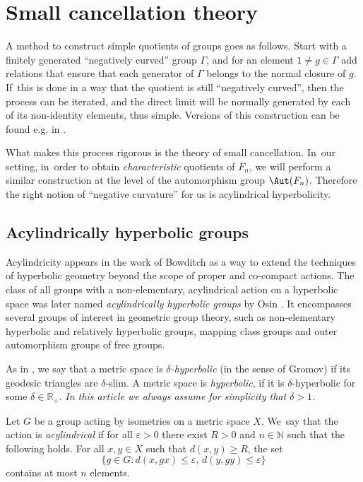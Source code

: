 \section{Small cancellation theory}

A method to construct simple quotients of groups goes as follows. Start with a finitely generated ``negatively curved'' group $\Gamma$, and for an element $1 \neq g \in \Gamma$ add relations that ensure that each generator of $\Gamma$ belongs to the normal closure of $g$. If~this is done in a way that the quotient is still ``negatively curved'', then the process can be iterated, and the direct limit will be normally generated by each of its non-identity elements, thus simple. Versions of this construction can be found e.g. in \cite{Olshanskii:1979b}.

What makes this process rigorous is the theory of small cancellation. In~our setting, in~order to obtain \emph{characteristic} quotients of $F_n$, we will perform a similar construction at the level of the automorphism group $\Aut(F_n)$. Therefore the right notion of ``negative curvature'' for us is acylindrical hyperbolicity.

\subsection{Acylindrically hyperbolic groups}
Acylindricity appears in the work of Bowditch \cite{Bowditch:2008bj} as a way to extend the techniques of hyperbolic geometry beyond the scope of proper and co-compact actions.
The class of all groups with a non-elementary, acylindrical action on a hyperbolic space was later named \emph{acylindrically hyperbolic groups} by Osin \cite{osin}.
It encompasses several groups of interest in geometric group theory, such as non-elementary hyperbolic and relatively hyperbolic groups, mapping class groups and outer automorphism groups of free groups.

As in \cite[III.H, Def.\,1.1]{BH},
we say that a metric space is \emph{$\delta$-hyperbolic} (in the sense of Gromov) if its geodesic triangles are $\delta$-slim.
A metric space is \emph{hyperbolic}, if it is $\delta$-hyperbolic for some $\delta \in\mathbb R_+$.
\emph{In this article we always assume for simplicity that $\delta > 1$.}

\begin{definition}
Let $G$ be a group acting by isometries on a metric space $X$. We~say that the action is \emph{acylindrical} if for all $\varepsilon > 0$ there exist $R > 0$ and $n \in \mathbb{N}$ such that the following holds. For all $x, y \in X$ such that $d(x, y) \geq R$, the set
\[
\{ g \in G : d(x, gx) \leq \varepsilon,\, d(y, gy) \leq \varepsilon \}
\]
contains at most $n$ elements.
\end{definition}

